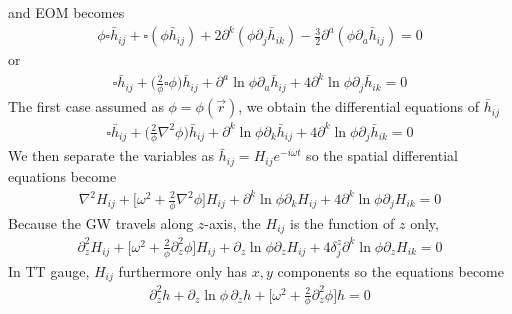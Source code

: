 \documentclass[
 jor,
 amsmath,amssymb,preprint,
]{revtex4-2}
\begin{document}
and EOM becomes
\begin{equation}
\begin{aligned}
\phi\square \bar{h}_{ij} + \square (\phi \bar{h}_{ij}) + 2\partial^k(\phi\partial_j \bar{h}_{ik}) - \frac{3}{2}\partial^a (\phi \partial_a \bar{h}_{ij}) = 0
\end{aligned}
\end{equation}
or
\begin{equation}
\begin{aligned}
\square \bar{h}_{ij} + \bigg(\frac{2}{\phi}\square \phi \bigg)\bar{h}_{ij} + \partial^a \ln\phi \partial_a\bar{h}_{ij} + 4\partial^k \ln\phi\partial_j \bar{h}_{ik} = 0
\end{aligned}
\end{equation}
The first case assumed as $\phi = \phi(\vec{r})$, we obtain the differential equations of $\bar{h}_{ij}$
\begin{equation}
\begin{aligned}
\square \bar{h}_{ij} + \bigg(\frac{2}{\phi}\nabla^2 \phi\bigg) \bar{h}_{ij} + \partial^k \ln\phi \partial_k \bar{h}_{ij} + 4\partial^k \ln\phi\partial_j \bar{h}_{ik} = 0
\end{aligned}
\end{equation}
We then separate the variables as $\bar{h}_{ij} = H_{ij}e^{-i\omega t}$ so the spatial differential equations become
\begin{equation}
\begin{aligned}
\nabla^2H_{ij} + \bigg[ \omega^2 + \frac{2}{\phi}\nabla^2 \phi\bigg]H_{ij} + \partial^k \ln\phi \partial_k H_{ij} + 4\partial^k \ln\phi\partial_j H_{ik} = 0
\end{aligned}
\end{equation}
Because the GW travels along $z$-axis, the $H_{ij}$ is the function of $z$ only,
\begin{equation}
\begin{aligned}
    \partial_z^2 H_{ij} + \bigg[ \omega^2 + \frac{2}{\phi}\partial_z^2 \phi \bigg]H_{ij} + \partial_z \ln\phi \partial_z H_{ij} + 4\delta^z_j\partial^k \ln\phi\partial_z H_{ik} = 0
\end{aligned}
\end{equation}
In TT gauge, $H_{ij}$ furthermore only has $x,y$ components so the equations become
\begin{equation}
\begin{aligned}
    \partial_z^2 h+ \partial_z \ln\phi\,\partial_z h + \bigg[ \omega^2 + \frac{2}{\phi}\partial_z^2 \phi \bigg]h  = 0 \label{desspteq1}
\end{aligned}
\end{equation}
\end{document}
